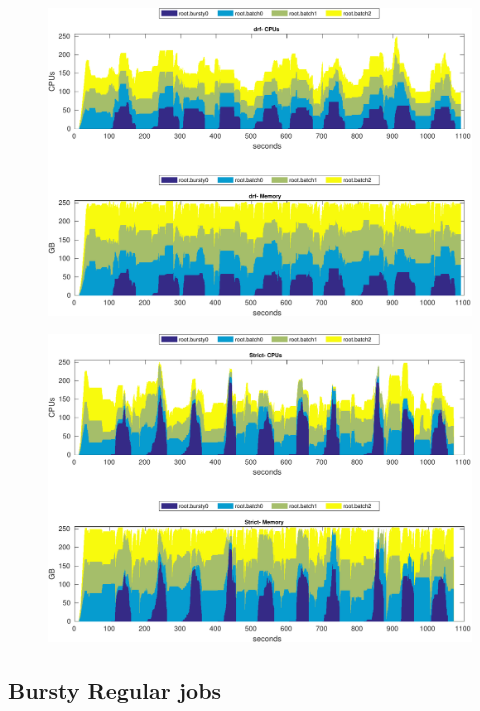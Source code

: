 \begin{figure}
\centering
\includegraphics[width=1.0\linewidth]{fig/b3_res_usage_drf_BB}
\caption{}
\label{fig:b3_res_usage_drf_BB}
\end{figure}

\begin{figure}
\centering
\includegraphics[width=1.0\linewidth]{fig/b3_res_usage_Strict_BB}
\caption{}
\label{fig:b3_res_usage_Strict_BB}
\end{figure}


\subsection{Bursty Regular jobs}


